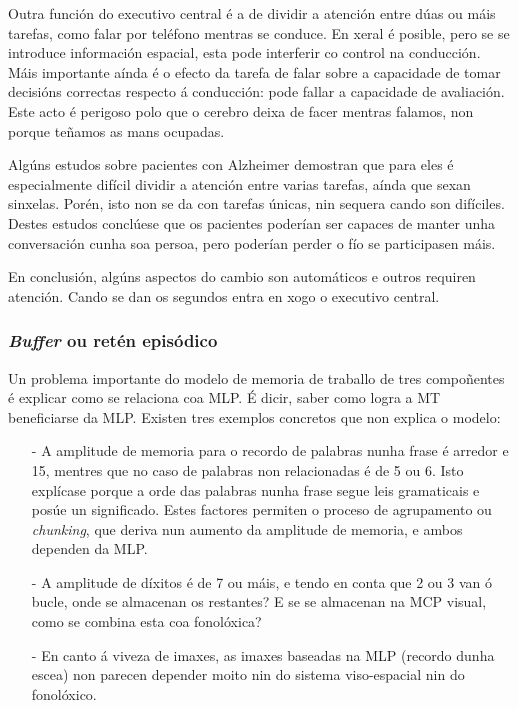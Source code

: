 \documentclass[a4paper,11pt]{article}
\begin{document}
Outra función do executivo central é a de dividir a atención entre dúas ou máis tarefas, como falar por teléfono mentras se conduce. En xeral é posible, pero se se introduce información espacial, esta pode interferir co control na conducción. Máis importante aínda é o efecto da tarefa de falar sobre a capacidade de tomar decisións correctas respecto á conducción: pode fallar a capacidade de avaliación. Este acto é perigoso polo que o cerebro deixa de facer mentras falamos, non porque teñamos as mans ocupadas.

Algúns estudos sobre pacientes con Alzheimer demostran que para eles é especialmente difícil dividir a atención entre varias tarefas, aínda que sexan sinxelas. Porén, isto non se da con tarefas únicas, nin sequera cando son difíciles. Destes estudos conclúese que os pacientes poderían ser capaces de manter unha conversación cunha soa persoa, pero poderían perder o fío se participasen máis.

En conclusión, algúns aspectos do cambio son automáticos e outros requiren atención. Cando se dan os segundos entra en xogo o executivo central.

\subsubsection{\textit{Buffer} ou retén episódico}
Un problema importante do modelo de memoria de traballo de tres compoñentes é explicar como se relaciona coa MLP. É dicir, saber como logra a MT beneficiarse da MLP. Existen tres exemplos concretos que non explica o modelo:
\begin{itemize}
	\item[-] A amplitude de memoria para o recordo de palabras nunha frase é arredor e 15, mentres
	que no caso de palabras non relacionadas é de 5 ou 6. Isto explícase porque a orde das palabras
	nunha frase segue leis gramaticais e posúe un significado. Estes factores permiten o proceso de
	agrupamento ou \textit{chunking}, que deriva nun aumento da amplitude de memoria, e ambos
	dependen da MLP.
	\item[-] A amplitude de díxitos é de 7 ou máis, e tendo en conta que 2 ou 3 van ó bucle, onde se
	almacenan os restantes? E se se almacenan na MCP visual, como se combina esta coa fonolóxica?
	\item[-] En canto á viveza de imaxes, as imaxes baseadas na MLP (recordo dunha escea) non
	parecen depender moito nin do sistema viso-espacial nin do fonolóxico.	
\end{itemize}
\end{document}
